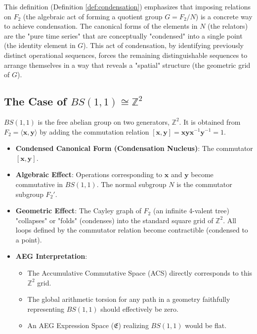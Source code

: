 \documentclass[12pt, a4paper]{article}
\theoremstyle{definition}
\begin{document}
This definition (Definition \ref{def:condensation}) emphasizes that imposing relations on $F_2$ (the algebraic act of forming a quotient group $G = F_2/N$) is a concrete way to achieve condensation. The canonical forms of the elements in $N$ (the relators) are the "pure time series" that are conceptually "condensed" into a single point (the identity element in $G$). This act of condensation, by identifying previously distinct operational sequences, forces the remaining distinguishable sequences to arrange themselves in a way that reveals a "spatial" structure (the geometric grid of $G$).

\subsection{The Case of $BS(1,1) \cong \mathbb{Z}^2$}
$BS(1,1)$ is the free abelian group on two generators, $\mathbb{Z}^2$. It is obtained from $F_2 = \langle \mathbf{x}, \mathbf{y} \rangle$ by adding the commutation relation $[\mathbf{x},\mathbf{y}] = \mathbf{x}\mathbf{y}\mathbf{x}^{-1}\mathbf{y}^{-1} = 1$.
\begin{itemize}
    \item \textbf{Condensed Canonical Form (Condensation Nucleus)}: The commutator $[\mathbf{x},\mathbf{y}]$.
    \item \textbf{Algebraic Effect}: Operations corresponding to $\mathbf{x}$ and $\mathbf{y}$ become commutative in $BS(1,1)$. The normal subgroup $N$ is the commutator subgroup $F_2'$.
    \item \textbf{Geometric Effect}: The Cayley graph of $F_2$ (an infinite 4-valent tree) "collapses" or "folds" (condenses) into the standard square grid of $\mathbb{Z}^2$. All loops defined by the commutator relation become contractible (condensed to a point).
    \item \textbf{AEG Interpretation}:
        \begin{itemize}
            \item The Accumulative Commutative Space (ACS) directly corresponds to this $\mathbb{Z}^2$ grid.
            \item The global arithmetic torsion for any path in a geometry faithfully representing $BS(1,1)$ should effectively be zero.
            \item An AEG Expression Space ($\mathfrak{E}$) realizing $BS(1,1)$ would be flat.
        \end{itemize}
\end{itemize}
\end{document}
